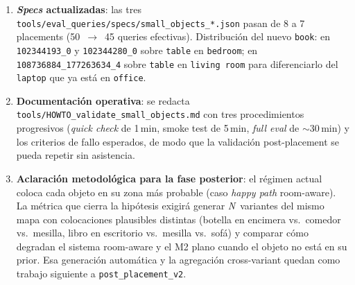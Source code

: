 \documentclass[11pt,a4paper]{article}
\begin{document}
\begin{enumerate}
\begin{itemize}
          \item \texttt{kettle} comparte exactamente el mismo prior que
                \texttt{teapot} (\texttt{kitchen}\,$=$\,1.0), morfología
                similar (asa $+$ pico) y YOLOE los confunde
                sistemáticamente. Tener los dos en la batería no añade
                señal experimental e infla la matriz de confusión.
          \item \texttt{book} aporta el caso multi-room interpretable
                (\texttt{office}\,${>}$\,\texttt{bedroom}\,${>}$\,\texttt{living}),
                forma distintiva, abundancia de \emph{assets} con
                \texttt{.object\_config.json} en HSSD y prior ya
                cargado en \texttt{room\_priors.py}. Es justo el tipo de
                consulta donde el razonamiento jerárquico debe destacar
                frente al M2 plano.
        \end{itemize}
  \item \textbf{\emph{Specs} actualizadas}: las tres
        \texttt{tools/eval\_queries/specs/small\_objects\_*.json}
        pasan de 8 a 7 placements (50~$\to$~45 queries efectivas).
        Distribución del nuevo \texttt{book}: en
        \texttt{102344193\_0} y \texttt{102344280\_0} sobre
        \texttt{table} en \texttt{bedroom}; en
        \texttt{108736884\_177263634\_4} sobre \texttt{table} en
        \texttt{living room} para diferenciarlo del \texttt{laptop} que
        ya está en \texttt{office}.
  \item \textbf{Documentación operativa}: se redacta
        \texttt{tools/HOWTO\_validate\_small\_objects.md} con tres
        procedimientos progresivos (\emph{quick check} de 1\,min, smoke
        test de 5\,min, \emph{full eval} de ${\sim}$30\,min) y los
        criterios de fallo esperados, de modo que la validación
        post-placement se pueda repetir sin asistencia.
  \item \textbf{Aclaración metodológica para la fase posterior}: el
        régimen actual coloca cada objeto en su zona más probable
        (caso \emph{happy path} room-aware). La métrica que cierra la
        hipótesis exigirá generar \emph{N}~variantes del mismo mapa con
        colocaciones plausibles distintas (botella en encimera vs.\
        comedor vs.\ mesilla, libro en escritorio vs.\ mesilla vs.\
        sofá) y comparar cómo degradan el sistema room-aware y el M2
        plano cuando el objeto no está en su prior. Esa generación
        automática y la agregación cross-variant quedan como trabajo
        siguiente a \texttt{post\_placement\_v2}.
\end{enumerate}
\end{document}
